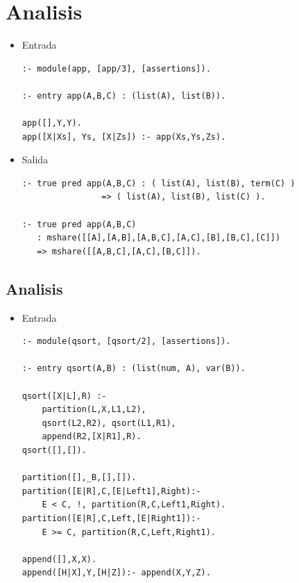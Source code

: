 \documentclass[11pt]{article}
\begin{document}
\section*{Analisis}
\label{sec:orgb70d27d}
\begin{itemize}
\item Entrada
\begin{verbatim}
:- module(app, [app/3], [assertions]).

:- entry app(A,B,C) : (list(A), list(B)).

app([],Y,Y).
app([X|Xs], Ys, [X|Zs]) :- app(Xs,Ys,Zs).
\end{verbatim}

\item Salida 
\begin{verbatim}
:- true pred app(A,B,C) : ( list(A), list(B), term(C) )
			    => ( list(A), list(B), list(C) ).

:- true pred app(A,B,C) 
   : mshare([[A],[A,B],[A,B,C],[A,C],[B],[B,C],[C]])
   => mshare([[A,B,C],[A,C],[B,C]]).

\end{verbatim}
\end{itemize}

\subsection*{Analisis}
\label{sec:org0570065}
\begin{itemize}
\item Entrada
\begin{verbatim}
:- module(qsort, [qsort/2], [assertions]).

:- entry qsort(A,B) : (list(num, A), var(B)).

qsort([X|L],R) :-
    partition(L,X,L1,L2),
    qsort(L2,R2), qsort(L1,R1),
    append(R2,[X|R1],R).
qsort([],[]).

partition([],_B,[],[]).
partition([E|R],C,[E|Left1],Right):-
    E < C, !, partition(R,C,Left1,Right).
partition([E|R],C,Left,[E|Right1]):-
    E >= C, partition(R,C,Left,Right1).

append([],X,X).
append([H|X],Y,[H|Z]):- append(X,Y,Z).
\end{verbatim}
\end{itemize}
\end{document}
